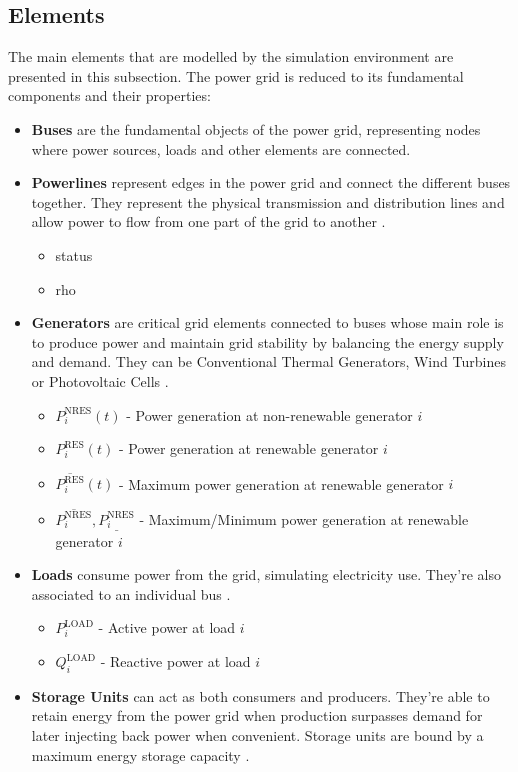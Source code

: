 \subsection{Elements}

The main elements that are modelled by the simulation environment are presented in this subsection. The power grid is reduced to its fundamental components and their properties:

\begin{itemize}
	\item \textbf{Buses} are the fundamental objects of the power grid, representing nodes where power sources, loads and other elements are connected\cite{rtefranceGrid2OpDocumentation}.
	
	\item \textbf{Powerlines} represent edges in the power grid and connect the different buses together. They represent the physical transmission and distribution lines and allow power to flow from one part of the grid to another \cite{rtefranceGrid2OpDocumentation}.
	\begin{itemize}
		\item status
		\item rho
	\end{itemize}
	
	\item \textbf{Generators} are critical grid elements connected to buses whose main role is to produce power and maintain grid stability by balancing the energy supply and demand. They can be Conventional Thermal Generators, Wind Turbines or Photovoltaic Cells \cite{rtefranceGrid2OpDocumentation}.
	\begin{itemize}
		\item $P^\text{NRES}_i(t)$ - Power generation at non-renewable generator $i$
		\item $P^\text{RES}_i(t)$ - Power generation at renewable generator $i$
		\item $\overline{P^\text{RES}_i}(t)$ - Maximum power generation at renewable generator $i$
		\item $\overline{P^\text{NRES}_i}, \underline{P^\text{NRES}_i}$ - Maximum/Minimum power generation at renewable generator $i$
	\end{itemize}
	
	
	\item \textbf{Loads} consume power from the grid, simulating electricity use. They're also associated to an individual bus \cite{rtefranceGrid2OpDocumentation}.
	\begin{itemize}
		\item $P^\text{LOAD}_i$ - Active power at load $i$
		\item $Q^\text{LOAD}_i$ - Reactive power at load $i$
	\end{itemize}
	
	\item \textbf{Storage Units} can act as both consumers and producers. They're able to retain energy from the power grid when production surpasses demand for later injecting back power when convenient. Storage units are bound by a maximum energy storage capacity \cite{rtefranceGrid2OpDocumentation}.
\end{itemize}


